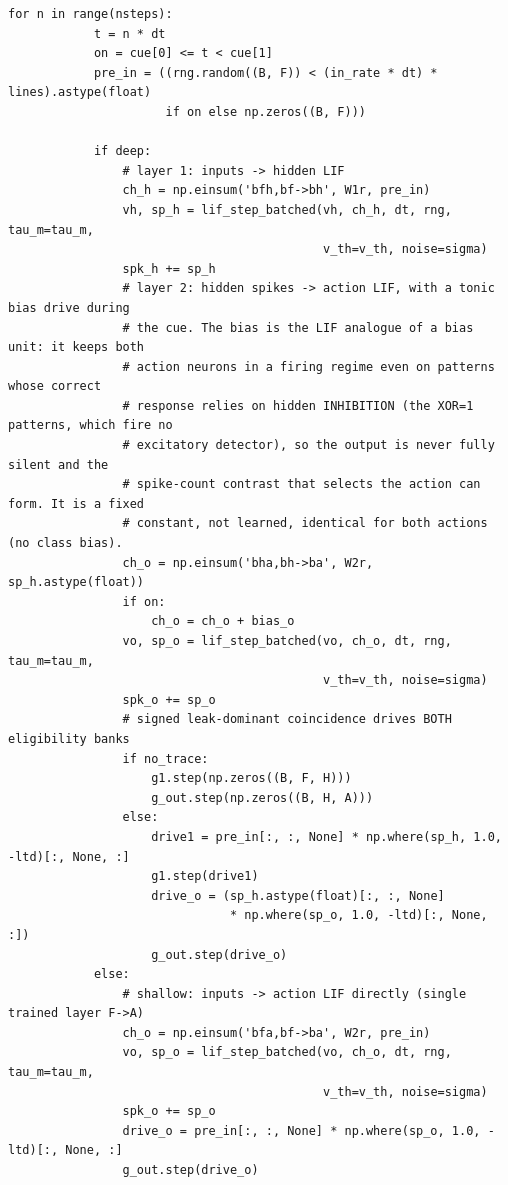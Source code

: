 \begin{lstlisting}[caption={mrl\_trace/deep.py},label={lst:siox-src-deep}]
        for n in range(nsteps):
            t = n * dt
            on = cue[0] <= t < cue[1]
            pre_in = ((rng.random((B, F)) < (in_rate * dt) * lines).astype(float)
                      if on else np.zeros((B, F)))

            if deep:
                # layer 1: inputs -> hidden LIF
                ch_h = np.einsum('bfh,bf->bh', W1r, pre_in)
                vh, sp_h = lif_step_batched(vh, ch_h, dt, rng, tau_m=tau_m,
                                            v_th=v_th, noise=sigma)
                spk_h += sp_h
                # layer 2: hidden spikes -> action LIF, with a tonic bias drive during
                # the cue. The bias is the LIF analogue of a bias unit: it keeps both
                # action neurons in a firing regime even on patterns whose correct
                # response relies on hidden INHIBITION (the XOR=1 patterns, which fire no
                # excitatory detector), so the output is never fully silent and the
                # spike-count contrast that selects the action can form. It is a fixed
                # constant, not learned, identical for both actions (no class bias).
                ch_o = np.einsum('bha,bh->ba', W2r, sp_h.astype(float))
                if on:
                    ch_o = ch_o + bias_o
                vo, sp_o = lif_step_batched(vo, ch_o, dt, rng, tau_m=tau_m,
                                            v_th=v_th, noise=sigma)
                spk_o += sp_o
                # signed leak-dominant coincidence drives BOTH eligibility banks
                if no_trace:
                    g1.step(np.zeros((B, F, H)))
                    g_out.step(np.zeros((B, H, A)))
                else:
                    drive1 = pre_in[:, :, None] * np.where(sp_h, 1.0, -ltd)[:, None, :]
                    g1.step(drive1)
                    drive_o = (sp_h.astype(float)[:, :, None]
                               * np.where(sp_o, 1.0, -ltd)[:, None, :])
                    g_out.step(drive_o)
            else:
                # shallow: inputs -> action LIF directly (single trained layer F->A)
                ch_o = np.einsum('bfa,bf->ba', W2r, pre_in)
                vo, sp_o = lif_step_batched(vo, ch_o, dt, rng, tau_m=tau_m,
                                            v_th=v_th, noise=sigma)
                spk_o += sp_o
                drive_o = pre_in[:, :, None] * np.where(sp_o, 1.0, -ltd)[:, None, :]
                g_out.step(drive_o)


\end{lstlisting}
